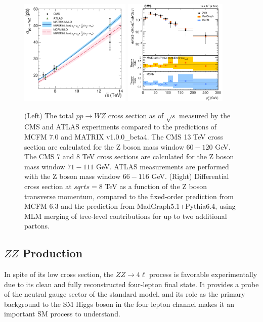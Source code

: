 \documentclass[10pt]{article}
\begin{document}
\begin{figure}[htb]
  \centering
    \includegraphics[height=2in]{figures/WZCrossSection_vs_sqrtS.pdf}
    \includegraphics[height=2in]{figures/WZ8TeV_ptZ_unfolded.png}
    \caption{ (Left) The total $pp \rightarrow WZ$ cross section
      as of $\sqrt{s}$ measured by the CMS and 
      ATLAS experiments compared to the predictions of MCFM 7.0 and MATRIX v1.0.0\_beta4. 
      The CMS 13 TeV cross section are calculated for the Z boson mass window $60 - 120$ GeV. 
      The CMS 7 and 8  TeV  cross sections are calculated for the Z boson mass window $71 - 111$ GeV.
      ATLAS measurements are performed with the Z boson mass window $66 - 116$  GeV.
      (Right) Differential cross section at $sqrt{s} = 8$ TeV as a function
      of the Z boson transverse momentum,
      compared to
      the fixed-order prediction from MCFM 6.3 and the prediction from
      MadGraph5.1+Pythia6.4, using MLM merging of tree-level contributions 
      for up to two additional partons.
      }
  \label{fig:WZfigs}
\end{figure}

\subsection{$ZZ$ Production}

In spite of its low cross section, the $ZZ \rightarrow 4\ell$ process 
is favorable experimentally due to its clean and fully reconstructed 
four-lepton final state. It provides a probe of the neutral gauge sector 
of the standard model, and its role as the primary background to the SM Higgs
boson in the four lepton channel makes it an important SM 
process to understand.
\end{document}
